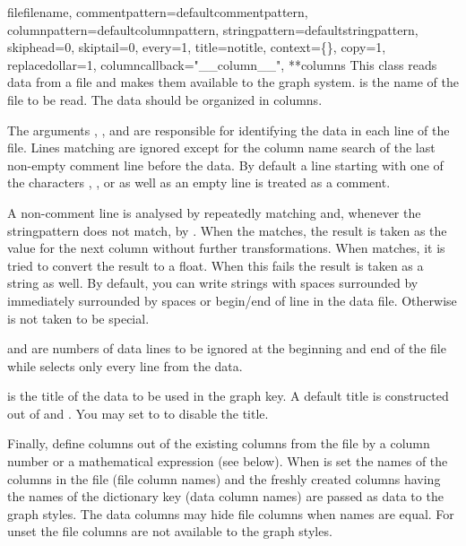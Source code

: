 \begin{classdesc}{file}{filename, %
                        commentpattern=defaultcommentpattern,
                        columnpattern=defaultcolumnpattern,
                        stringpattern=defaultstringpattern,
                        skiphead=0, skiptail=0, every=1, title=notitle,
                        context=\{\}, copy=1,
                        replacedollar=1, columncallback="\_\_column\_\_",
                        **columns}
  This class reads data from a file and makes them available to the
  graph system.  is the name of the file to be read.
  The data should be organized in columns.

  The arguments , , and
   are responsible for identifying the data in each
  line of the file. Lines matching  are ignored
  except for the column name search of the last non-empty comment line
  before the data. By default a line starting with one of the
  characters \character{\#}, \character{\%}, or \character{!} as well
  as an empty line is treated as a comment.

  A non-comment line is analysed by repeatedly matching
   and, whenever the stringpattern does not match,
  by . When the  matches, the
  result is taken as the value for the next column without further
  transformations. When  matches, it is tried to
  convert the result to a float. When this fails the result is taken
  as a string as well. By default, you can write strings with spaces
  surrounded by \character{\textquotedbl} immediately surrounded by
  spaces or begin/end of line in the data file. Otherwise
  \character{\textquotedbl} is not taken to be special.

   and  are numbers of data lines to be
  ignored at the beginning and end of the file while 
  selects only every  line from the data.

   is the title of the data to be used in the graph key. A
  default title is constructed out of  and
  . You may set  to  to disable
  the title.

  Finally,  define columns out of the existing columns
  from the file by a column number or a mathematical expression (see
  below). When  is set the names of the columns in the file
  (file column names) and the freshly created columns having the names
  of the dictionary key (data column names) are passed as data to the
  graph styles. The data columns may hide file columns when names are
  equal. For unset  the file columns are not available to
  the graph styles.


\end{classdesc}

